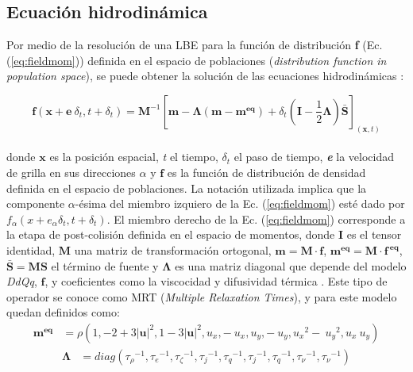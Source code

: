 \subsection{Ecuación hidrodinámica}

Por medio de la resolución de una LBE para la función de distribución \textbf{f} (Ec.(\ref{eq:fieldmom})) definida en el espacio de poblaciones (\textit{distribution function in population space}), se puede obtener la solución de las ecuaciones hidrodinámicas \cite{li2013lattice}:

\begin{equation}
    \mathbf{f}(\mathbf{x} + \mathbf{e} \> \delta_{t} , t + \delta_{t}) = \mathbf{M}^{-1} \left[ \mathbf{m} - \mathbf{\Lambda}(\mathbf{m} - \mathbf{m^{eq}}) + \delta_{t} \left( \mathbf{I} - \frac{1}{2} \mathbf{\Lambda} \right) \mathbf{\bar{S}}  \right]_{(\mathbf{x},t)} 
    \label{eq:fieldmom}
\end{equation}\\
donde $\mathbf{x}$ es la posición espacial, \textit{t} el tiempo, $\delta_{t}$ el paso de tiempo, \textit{\textbf{e}} la velocidad de grilla en sus direcciones $\alpha$ y $\mathbf{f}$ es la función de distribución de densidad definida en el espacio de poblaciones. La notación utilizada implica que la componente $\alpha$-ésima del miembro izquiero de la Ec. (\ref{eq:fieldmom}) esté dado por $f_{\alpha}(x + e_{\alpha} \delta_{t}  , t + \delta_{t} )$. El miembro derecho de la Ec. (\ref{eq:fieldmom}) corresponde a la etapa de post-colisión definida en el espacio de momentos, donde \textbf{I} es el tensor identidad, $\mathbf{M}$ una matriz de transformación ortogonal, $\mathbf{m} = \mathbf{M} \cdot \mathbf{f}$, $\mathbf{m^{eq}} = \mathbf{M} \cdot \mathbf{f^{\>eq}}$, $\mathbf{\bar{S}} = \mathbf{M} \mathbf{S}$ el término de fuente y $ \mathbf{\Lambda}$ es una matriz diagonal que depende del modelo \textit{DdQq}, $\mathbf{f}$, y coeficientes como la viscocidad y difusividad térmica \cite{succi2018lattice}. Este tipo de operador se conoce como MRT (\textit{Multiple Relaxation Times}), y para este modelo quedan definidos como:
\begin{align}
	\mathbf{m^{eq}} & =  \rho  \left( 1, - 2 + 3 {|\mathbf{u}|}^{2} , 1 - 3{|\mathbf{u}|}^{2} , u_{x} , -\> u_{x} , u_{y} , -\> u_{y} , {u_{x}}^{2} -\> {u_{y}}^{2} , u_{x} \> u_{y} \right) \label{eq:m}
\end{align}
\begin{align}
	\mathbf{\Lambda}  & = diag ( {\tau_{\rho }}^{-1},{\tau_{e}}^{-1},{\tau_{\zeta }}^{-1},{\tau_{j}}^{-1},{\tau_{q}}^{-1},{\tau_{j}}^{-1},{\tau_{q}}^{-1},{\tau_{\nu }}^{-1},{\tau_{\nu}}^{-1}) 
	\label{eq:lambda}
\end{align}

